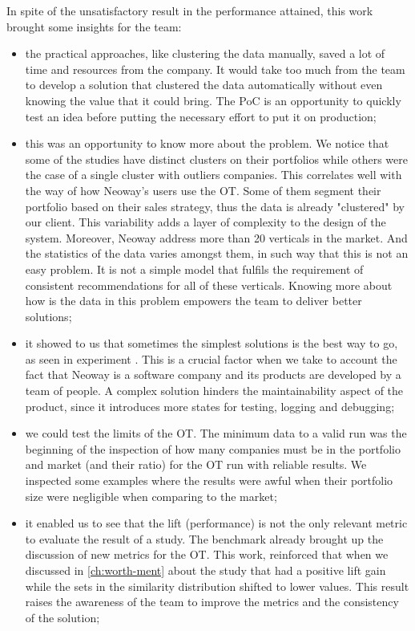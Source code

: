 In spite of the unsatisfactory result in the performance attained, this work brought some insights for the team:
\begin{itemize}
    \item the practical approaches, like clustering the data manually, saved a lot of time and resources from the company. It would take too much from the team to develop a solution that clustered the data automatically without even knowing the value that it could bring. The PoC is an opportunity to quickly test an idea before putting the necessary effort to put it on production;
    \item this was an opportunity to know more about the problem. We notice that some of the studies have distinct clusters on their portfolios while others were the case of a single cluster with outliers companies. This correlates well with the way of how Neoway's users use the OT. Some of them segment their portfolio based on their sales strategy, thus the data is already "clustered" by our client. This variability adds a layer of complexity to the design of the system. Moreover, Neoway address more than 20 verticals in the market. And the statistics of the data varies amongst them, in such way that this is not an easy problem. It is not a simple model that fulfils the requirement of consistent recommendations for all of these verticals. Knowing more about how is the data in this problem empowers the team to deliver better solutions;
    \item it showed to us that sometimes the simplest solutions is the best way to go, as seen in experiment \nameExperimentII{}. This is a crucial factor when we take to account the fact that Neoway is a software company and its products are developed by a team of people. A complex solution hinders the maintainability aspect of the product, since it introduces more states for testing, logging and debugging;
    \item we could test the limits of the OT. The minimum data to a valid run was the beginning of the inspection of how many companies must be in the portfolio and market (and their ratio) for the OT run with reliable results. We inspected some examples where the results were awful when their portfolio size were negligible when comparing to the market;
    \item it enabled us to see that the lift (performance) is not the only relevant metric to evaluate the result of a study. The benchmark already brought up the discussion of new metrics for the OT. This work, reinforced that when we discussed in \ref{ch:worth-ment} about the study that had a positive lift gain while the sets in the similarity distribution shifted to lower values. This result raises the awareness of the team to improve the metrics and the consistency of the solution;
\end{itemize}

